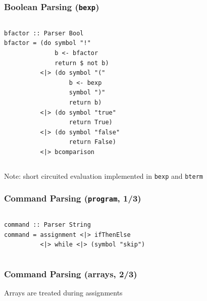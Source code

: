 \documentclass{beamer}
\begin{document}
\begin{frame}[fragile]
	\frametitle{Boolean Parsing (\texttt{bexp})}
	\begin{columns}
		
\begin{lstlisting}[basicstyle=\ttfamily\tiny]
bfactor :: Parser Bool
bfactor = (do symbol "!"
              b <- bfactor
              return $ not b)
          <|> (do symbol "("
                  b <- bexp
                  symbol ")"
                  return b)
          <|> (do symbol "true"
                  return True)
          <|> (do symbol "false"
                  return False)
          <|> bcomparison
\end{lstlisting}
		
		
	\end{columns}
	\centerline{\scriptsize Note: short circuited evaluation implemented in \texttt{bexp} and \texttt{bterm}}
\end{frame}

\begin{frame}[fragile]
	\frametitle{Command Parsing (\texttt{program}, 1/3)}
	\begin{columns}
		\column{0.45\textwidth}
		
\begin{lstlisting}[basicstyle=\ttfamily\tiny]
command :: Parser String
command = assignment <|> ifThenElse
          <|> while <|> (symbol "skip")
\end{lstlisting}
		\column{0.45\textwidth}
		
	\end{columns}
\end{frame}

\begin{frame}
	\frametitle{Command Parsing (arrays, 2/3)}
	\centerline{\small Arrays are treated during assignments}
	
\end{frame}
\end{document}
